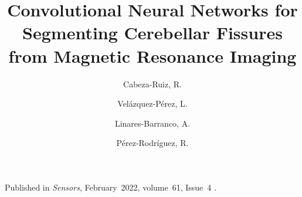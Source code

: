 \author
{
    Cabeza-Ruiz, R.
    \and
    Velázquez-Pérez, L.
    \and
    Linares-Barranco, A.
    \and
    Pérez-Rodríguez, R.
}
\title{Convolutional Neural Networks for Segmenting Cerebellar Fissures from Magnetic Resonance Imaging}
\metadata
{
    Published in \emph{Sensors},
    February~2022,
    volume~61,
    Issue~4
    .
}
\maketitle
\label{pap:third}
